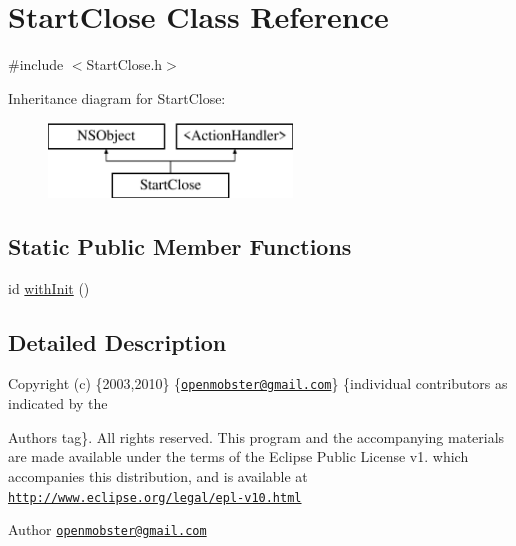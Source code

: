 \hypertarget{interface_start_close}{
\section{\-Start\-Close \-Class \-Reference}
\label{interface_start_close}
}


{\ttfamily \#include $<$\-Start\-Close.\-h$>$}

\-Inheritance diagram for \-Start\-Close\-:\begin{figure}[H]
\begin{center}
\leavevmode
\includegraphics[height=2.000000cm]{interface_start_close}
\end{center}
\end{figure}
\subsection*{\-Static \-Public \-Member \-Functions}
\begin{DoxyCompactItemize}
\item 
id \hyperlink{interface_start_close_ade025fde8f9e7589f74ef9d9382c5c22}{with\-Init} ()
\end{DoxyCompactItemize}


\subsection{\-Detailed \-Description}
\-Copyright (c) \{2003,2010\} \{\href{mailto:openmobster@gmail.com}{\tt openmobster@gmail.\-com}\} \{individual contributors as indicated by the \begin{DoxyAuthor}{\-Authors}
tag\}. \-All rights reserved. \-This program and the accompanying materials are made available under the terms of the \-Eclipse \-Public \-License v1. which accompanies this distribution, and is available at \href{http://www.eclipse.org/legal/epl-v10.html}{\tt http\-://www.\-eclipse.\-org/legal/epl-\/v10.\-html}
\end{DoxyAuthor}
\begin{DoxyAuthor}{\-Author}
\href{mailto:openmobster@gmail.com}{\tt openmobster@gmail.\-com} 
\end{DoxyAuthor}



